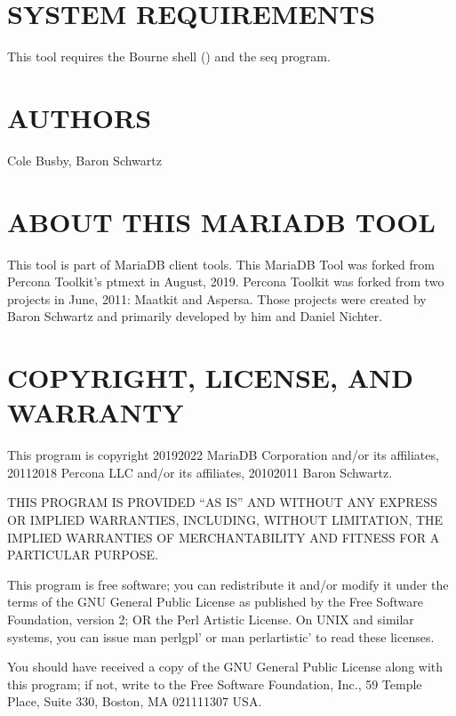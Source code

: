\documentclass[letterpaper,10pt,english]{sphinxmanual}
\begin{document}
\section{SYSTEM REQUIREMENTS}
\label{\detokenize{mariadb-status-diff:system-requirements}}
This tool requires the Bourne shell () and the seq program.


\section{AUTHORS}
\label{\detokenize{mariadb-status-diff:authors}}
Cole Busby, Baron Schwartz


\section{ABOUT THIS MARIADB TOOL}
\label{\detokenize{mariadb-status-diff:about-this-mariadb-tool}}
This tool is part of MariaDB client tools. This MariaDB Tool was forked from
Percona Toolkit’s pt\sphinxhyphen{}mext in August, 2019. Percona Toolkit was forked from two
projects in June, 2011: Maatkit and Aspersa.  Those projects were created by
Baron Schwartz and primarily developed by him and Daniel Nichter.


\section{COPYRIGHT, LICENSE, AND WARRANTY}
\label{\detokenize{mariadb-status-diff:copyright-license-and-warranty}}
This program is copyright 2019\sphinxhyphen{}2022 MariaDB Corporation and/or its affiliates,
2011\sphinxhyphen{}2018 Percona LLC and/or its affiliates, 2010\sphinxhyphen{}2011 Baron Schwartz.

THIS PROGRAM IS PROVIDED “AS IS” AND WITHOUT ANY EXPRESS OR IMPLIED
WARRANTIES, INCLUDING, WITHOUT LIMITATION, THE IMPLIED WARRANTIES OF
MERCHANTABILITY AND FITNESS FOR A PARTICULAR PURPOSE.

This program is free software; you can redistribute it and/or modify it under
the terms of the GNU General Public License as published by the Free Software
Foundation, version 2; OR the Perl Artistic License.  On UNIX and similar
systems, you can issue \textasciigrave{}man perlgpl’ or \textasciigrave{}man perlartistic’ to read these
licenses.

You should have received a copy of the GNU General Public License along with
this program; if not, write to the Free Software Foundation, Inc., 59 Temple
Place, Suite 330, Boston, MA  02111\sphinxhyphen{}1307  USA.
\end{document}
